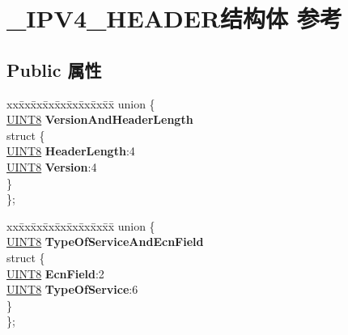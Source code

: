 \hypertarget{struct___i_p_v4___h_e_a_d_e_r}{}\section{\+\_\+\+I\+P\+V4\+\_\+\+H\+E\+A\+D\+E\+R结构体 参考}
\label{struct___i_p_v4___h_e_a_d_e_r}
\subsection*{Public 属性}
\begin{DoxyCompactItemize}
\item 
\mbox{\label{struct___i_p_v4___h_e_a_d_e_r_a7d25acbe86abcaf27815265272dadb04}} 
\begin{tabbing}
xx\=xx\=xx\=xx\=xx\=xx\=xx\=xx\=xx\=\kill
union \{\\
\>\hyperlink{_processor_bind_8h_ab27e9918b538ce9d8ca692479b375b6a}{UINT8} {\bfseries VersionAndHeaderLength}\\
\mbox{\label{union___i_p_v4___h_e_a_d_e_r_1_1_0D2627_a9de5758f78e768c6a22c725de5215e7a}} 
\>struct \{\\
\>\>\hyperlink{_processor_bind_8h_ab27e9918b538ce9d8ca692479b375b6a}{UINT8} {\bfseries HeaderLength}:4\\
\>\>\hyperlink{_processor_bind_8h_ab27e9918b538ce9d8ca692479b375b6a}{UINT8} {\bfseries Version}:4\\
\>\} \\
\}; \\

\end{tabbing}\item 
\mbox{\label{struct___i_p_v4___h_e_a_d_e_r_a8b98dd030f734fa9cad545ffaa54ebdf}} 
\begin{tabbing}
xx\=xx\=xx\=xx\=xx\=xx\=xx\=xx\=xx\=\kill
union \{\\
\>\hyperlink{_processor_bind_8h_ab27e9918b538ce9d8ca692479b375b6a}{UINT8} {\bfseries TypeOfServiceAndEcnField}\\
\mbox{\label{union___i_p_v4___h_e_a_d_e_r_1_1_0D2629_ac37e6b590328d063859c891b31ad5a94}} 
\>struct \{\\
\>\>\hyperlink{_processor_bind_8h_ab27e9918b538ce9d8ca692479b375b6a}{UINT8} {\bfseries EcnField}:2\\
\>\>\hyperlink{_processor_bind_8h_ab27e9918b538ce9d8ca692479b375b6a}{UINT8} {\bfseries TypeOfService}:6\\
\>\} \\
\}; \\


\end{tabbing}
\end{DoxyCompactItemize}
